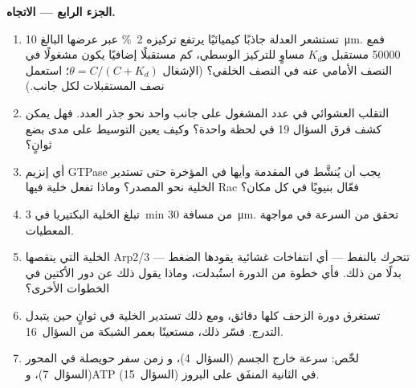 \begin{problem}
\medskip
\noindent\textbf{الجزء الرابع --- الاتجاه.}
\begin{enumerate}[resume]
  \item تستشعر العدلة جاذبًا كيميائيًا يرتفع تركيزه
        \qty{2}{\%} عبر عرضها البالغ \qty{10}{\micro m}. فمع
        \num{50000} مستقبل و$K_{d}$ مساوٍ للتركيز الوسطي،
        كم مستقبلًا إضافيًا يكون مشغولًا في النصف الأمامي
        عنه في النصف الخلفي؟ (الإشغال $\theta = C/(C +
        K_{d})$؛ استعمل نصف المستقبلات لكل جانب.)
  \item التقلب العشوائي في عدد المشغول على جانب واحد
        نحو جذر العدد. فهل يمكن كشف فرق
        السؤال 19 في لحظة واحدة؟ وكيف يعين التوسيط
        على مدى بضع ثوانٍ؟
  \item أي إنزيم GTPase يجب أن يُنشَّط في المقدمة وأيها في
        المؤخرة حتى تستدير الخلية نحو المصدر؟ وماذا تفعل خلية
        فيها Rac فعّال بنيويًا في كل مكان؟
  \item تبلغ الخلية البكتيريا في \qty{3}{min} من مسافة
        \qty{30}{\micro m}. تحقق من السرعة في مواجهة المعطيات.
  \item الخلية التي ينقصها Arp2/3 تتحرك بالنفط --- أي انتفاخات
        غشائية يقودها الضغط --- بدلًا من ذلك. فأي خطوة من الدورة
        استُبدلت، وماذا يقول ذلك عن دور الأكتين في
        الخطوات الأخرى؟
  \item تستغرق دورة الزحف كلها دقائق، ومع ذلك تستدير الخلية
        في ثوانٍ حين يتبدل التدرج. فسّر ذلك، مستعينًا
        بعمر الشبكة من السؤال~16.
  \item لخّص: سرعة  خارج الجسم (السؤال~4)، و
        زمن سفر حويصلة في المحور (السؤال~7)، وATP
        في الثانية المنفَق على البروز (السؤال~15).
\end{enumerate}
\end{problem}
